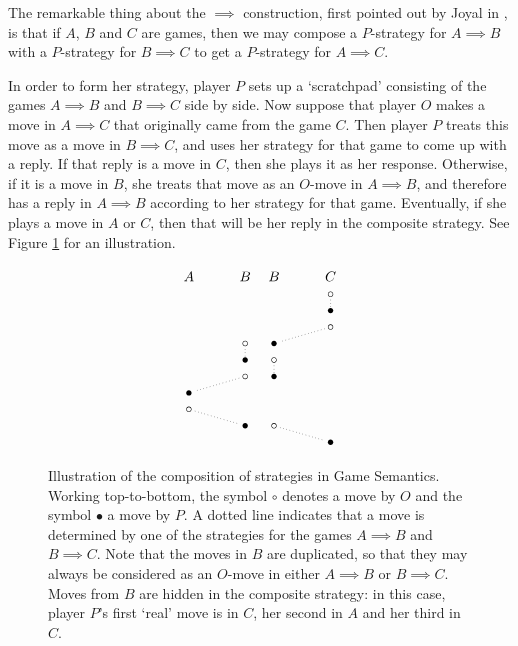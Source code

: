 \documentclass[11pt]{report}
\begin{document}
The remarkable thing about the $\implies$ construction, first pointed out by Joyal in \cite{joyalgames}, is that if $A$, $B$ and $C$ are games, then we may compose a $P$-strategy for $A\implies B$ with a $P$-strategy for $B\implies C$ to get a $P$-strategy for $A\implies C$.

In order to form her strategy, player $P$ sets up a `scratchpad' consisting of the games $A\implies B$ and $B\implies C$ side by side.
Now suppose that player $O$ makes a move in $A\implies C$ that originally came from the game $C$.  
Then player $P$ treats this move as a move in $B\implies C$, and uses her strategy for that game to come up with a reply.  
If that reply is a move in $C$, then she plays it as her response.
Otherwise, if it is a move in $B$, she treats that move as an $O$-move in $A\implies B$, and therefore has a reply in $A\implies B$ according to her strategy for that game.  
Eventually, if she plays a move in $A$ or $C$, then that will be her reply in the composite strategy.
See Figure \ref{FigComposition} for an illustration.
\begin{figure}
  \[
    \begin{tikzcd}[arrows={no head, dotted, shorten=-1mm}, row sep=0pt]
      A
        & B
          &[-20pt] B
            & C \\
        & 
          &
            & \circ \arrow[d] \\
        & 
          & 
            & \bullet \\
        & 
          & 
            & \circ \arrow[dl] \\
        & \circ \arrow[d]
          & \bullet
            & \\
        & \bullet
          & \circ \arrow[d]
            & \\
        & \circ \arrow[dl]
          & \bullet
            & \\
      \bullet
        &
          &
            & \\
      \circ \arrow[dr]
        &
          &
            & \\
        & \bullet
          & \circ \arrow[dr]
            & \\
        &
          &
            & \bullet
    \end{tikzcd}
    \]
  \caption[Illustration of the composition of strategies in Game Semantics.]{Illustration of the composition of strategies in Game Semantics.  
  Working top-to-bottom, the symbol $\circ$ denotes a move by $O$ and the symbol $\bullet$ a move by $P$.  
  A dotted line indicates that a move is determined by one of the strategies for the games $A\implies B$ and $B\implies C$.  
  Note that the moves in $B$ are duplicated, so that they may always be considered as an $O$-move in either $A\implies B$ or $B\implies C$.  
  Moves from $B$ are hidden in the composite strategy: in this case, player $P$'s first `real' move is in $C$, her second in $A$ and her third in $C$.}
  \label{FigComposition}
\end{figure}
\end{document}

